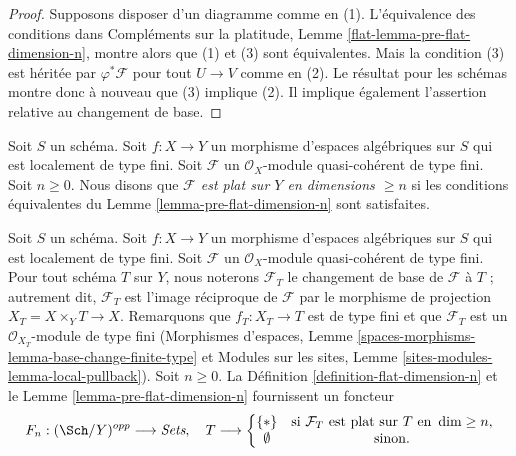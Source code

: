 \begin{proof}
Supposons disposer d'un diagramme comme en (1). L'équivalence des
conditions dans Compléments sur la platitude, Lemme \ref{flat-lemma-pre-flat-dimension-n},
montre alors que (1) et (3) sont équivalentes. Mais la condition (3) est héritée
par $\varphi^*\mathcal{F}$ pour tout $U \to V$ comme en (2).
Le résultat pour les schémas montre donc à nouveau que (3) implique (2).
Il implique également l'assertion relative au changement de base.
\end{proof}

\begin{definition}
\label{definition-flat-dimension-n}
Soit $S$ un schéma. Soit $f : X \to Y$ un morphisme d'espaces algébriques
sur $S$ qui est localement de type fini.
Soit $\mathcal{F}$ un $\mathcal{O}_X$-module quasi-cohérent de type fini.
Soit $n \geq 0$.
Nous disons que {\it $\mathcal{F}$ est plat sur $Y$ en dimensions $\geq n$}
si les conditions équivalentes du Lemme \ref{lemma-pre-flat-dimension-n}
sont satisfaites.
\end{definition}

\begin{situation}
\label{situation-flat-dimension-n}
Soit $S$ un schéma. Soit $f : X \to Y$ un morphisme d'espaces algébriques
sur $S$ qui est localement de type fini. Soit $\mathcal{F}$ un
$\mathcal{O}_X$-module quasi-cohérent de type fini. Pour tout schéma $T$ sur $Y$, nous
noterons $\mathcal{F}_T$ le changement de base de $\mathcal{F}$ à $T$ ; autrement dit,
$\mathcal{F}_T$ est l'image réciproque de $\mathcal{F}$ par le morphisme de projection
$X_T = X \times_Y T \to X$. Remarquons que $f_T : X_T \to T$ est de type fini
et que $\mathcal{F}_T$ est un $\mathcal{O}_{X_T}$-module de type fini
(Morphismes d'espaces, Lemme
\ref{spaces-morphisms-lemma-base-change-finite-type}
et
Modules sur les sites, Lemme \ref{sites-modules-lemma-local-pullback}).
Soit $n \geq 0$. La Définition \ref{definition-flat-dimension-n} et le
Lemme \ref{lemma-pre-flat-dimension-n} fournissent un foncteur
\begin{equation}
\label{equation-flat-dimension-n}
F_n : (\Sch/Y)^{opp} \longrightarrow \textit{Sets}, \quad
T \longrightarrow \left\{
\begin{matrix}
\{*\} & \text{si }\mathcal{F}_T\text{ est plat sur }T\text{ en }\dim \geq n, \\
\emptyset & \text{sinon.}
\end{matrix}
\right.
\end{equation}
\end{situation}

